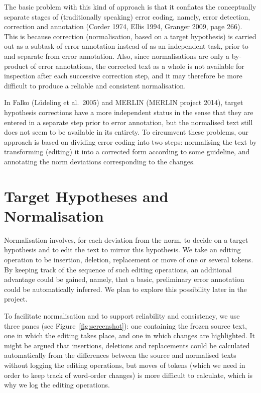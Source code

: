 \documentclass[10pt, a4paper]{article}
\begin{document}
The basic problem with this kind of approach is that it conflates the conceptually separate stages of (traditionally speaking) error coding, namely, error detection, correction and annotation (Corder 1974, Ellis 1994, Granger 2009, page 266). This is because correction (normalisation, based on a target hypothesis) is carried out as a subtask of error annotation instead of as an independent task, prior to and separate from error annotation. Also, since normalisations are only a by-product of error annotations, the corrected text as a whole is not available for inspection after each successive correction step, and it may therefore be more difficult to produce a reliable and consistent normalisation.

In Falko (L{\"u}deling et al.\ 2005) and MERLIN (MERLIN project 2014), target hypothesis corrections have a more independent status in the sense that they are entered in a separate step prior to error annotation, but the normalised text still does not seem to be available in its entirety. To circumvent these problems, our approach is based on dividing error coding into two steps: normalising the text by transforming (editing) it into a corrected form according to some guideline, and annotating the norm deviations corresponding to the changes.

\section{Target Hypotheses and Normalisation}

Normalisation involves, for each deviation from the norm, to decide on a target hypothesis and to edit the text to mirror this hypothesis. We take an editing operation to be insertion, deletion, replacement or move of one or several tokens. By keeping track of the sequence of such editing operations, an additional advantage could be gained, namely, that a basic, preliminary error annotation could be automatically inferred. We plan to explore this possibility later in the project.

To facilitate normalisation and to support reliability and consistency,
we use three panes (see Figure~\ref{fig:screenshot}): one containing the
frozen source text, one in which the editing takes place, and one in which
changes are highlighted. It might be argued that insertions, deletions and
replacements could be calculated automatically from the differences between
the source and normalised texts without logging the editing operations, but
moves of tokens (which we need in order to keep track of word-order changes)
is more difficult to calculate, which is why we log the editing operations.
\end{document}
